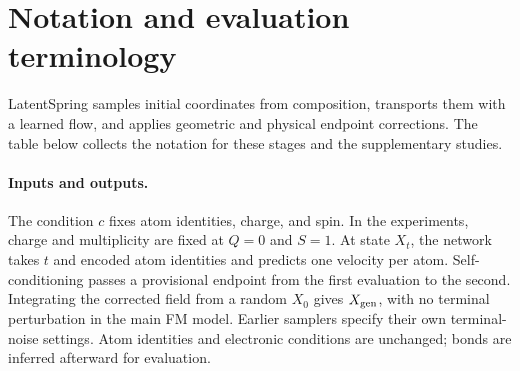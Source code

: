 \section{Notation and evaluation terminology}\label{app:notation}
LatentSpring samples initial coordinates from composition, transports them with a learned flow, and applies geometric and physical endpoint corrections. The table below collects the notation for these stages and the supplementary studies.

\paragraph{Inputs and outputs.}
The condition $c$ fixes atom identities, charge, and spin. In the experiments, charge and multiplicity are fixed at $Q=0$ and $S=1$. At state $X_t$, the network takes $t$ and encoded atom identities and predicts one velocity per atom. Self-conditioning passes a provisional endpoint from the first evaluation to the second. Integrating the corrected field from a random $X_0$ gives $X_{\rm gen}$, with no terminal perturbation in the main FM model. Earlier samplers specify their own terminal-noise settings. Atom identities and electronic conditions are unchanged; bonds are inferred afterward for evaluation.

